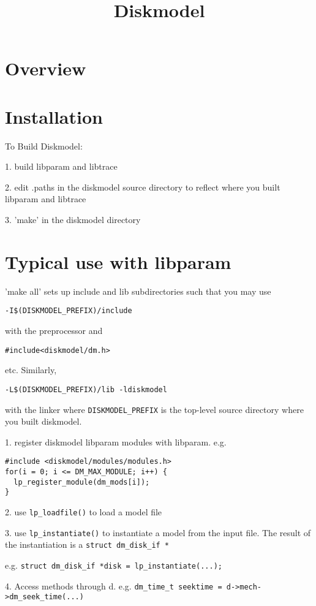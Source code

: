 \documentclass{article}
\begin{document}
\title{Diskmodel}
\maketitle

\section{Overview}






\section{Installation}
To Build Diskmodel:

1.  build libparam and libtrace 

2.  edit .paths in the diskmodel source directory to reflect where
you built libparam and libtrace

3.  'make' in the diskmodel directory

\section{Typical use with libparam}

'make all' sets up include and lib subdirectories such that
you may use 
\begin{verbatim}-I$(DISKMODEL_PREFIX)/include \end{verbatim}
with the preprocessor and 
\begin{verbatim}#include<diskmodel/dm.h> \end{verbatim} etc.  Similarly, 
\begin{verbatim}-L$(DISKMODEL_PREFIX)/lib -ldiskmodel \end{verbatim} 
with the linker where \texttt{DISKMODEL\_PREFIX} is the top-level
source directory where you built diskmodel.


1.  register diskmodel libparam modules with libparam. e.g.
\begin{verbatim}
#include <diskmodel/modules/modules.h>
for(i = 0; i <= DM_MAX_MODULE; i++) {
  lp_register_module(dm_mods[i]);
}
\end{verbatim}

2.  use \texttt{lp\_loadfile()} to load a model file

3.  use \texttt{lp\_instantiate()} to instantiate a model from the
input file.  The result of the instantiation is a \texttt{struct
dm\_disk\_if *}

e.g. \texttt{struct dm\_disk\_if *disk = lp\_instantiate(...);}


4.  Access methods through d.
e.g. \texttt{dm\_time\_t seektime = d->mech->dm\_seek\_time(...)}



\end{document}
